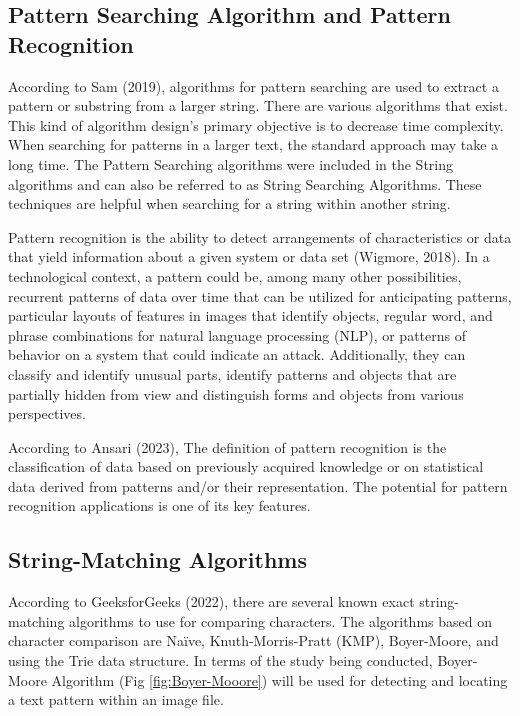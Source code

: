 \subsection*{Pattern Searching Algorithm and Pattern Recognition}
\hspace\parindent
According to Sam (2019), algorithms for pattern searching are used to extract a pattern or substring from a larger string. There are various algorithms that exist. This kind of algorithm design's primary objective is to decrease time complexity. When searching for patterns in a larger text, the standard approach may take a long time. The Pattern Searching algorithms were included in the String algorithms and can also be referred to as String Searching Algorithms. These techniques are helpful when searching for a string within another string.

\hfill

Pattern recognition is the ability to detect arrangements of characteristics or data that yield information about a given system or data set (Wigmore, 2018). In a technological context, a pattern could be, among many other possibilities, recurrent patterns of data over time that can be utilized for anticipating patterns, particular layouts of features in images that identify objects, regular word, and phrase combinations for natural language processing (NLP), or patterns of behavior on a system that could indicate an attack. Additionally, they can classify and identify unusual parts, identify patterns and objects that are partially hidden from view and distinguish forms and objects from various perspectives.

\hfill

According to Ansari (2023), The definition of pattern recognition is the classification of data based on previously acquired knowledge or on statistical data derived from patterns and/or their representation. The potential for pattern recognition applications is one of its key features.


\subsection*{String-Matching Algorithms}
\hspace\parindent
According to GeeksforGeeks (2022), there are several known exact string-matching algorithms to use
for comparing characters. The algorithms based on character comparison are Naïve, Knuth-Morris-Pratt
(KMP), Boyer-Moore, and using the Trie data structure. In terms of the study being conducted,
Boyer-Moore Algorithm (Fig \ref{fig:Boyer-Mooore}) will be used for detecting and locating a text pattern within an image file. 

